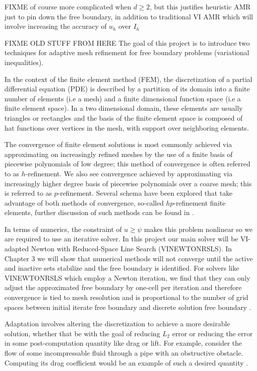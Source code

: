 \documentclass[]{interact}
\theoremstyle{plain}%
\theoremstyle{definition}
\theoremstyle{remark}
\begin{document}
FIXME of course more complicated when $d\ge 2$, but this justifies heuristic AMR just to pin down the free boundary, in addition to traditional VI AMR which will involve increasing the accuracy of $u_h$ over $I_h$

FIXME OLD STUFF FROM HERE The goal of this project is to introduce two techniques for adaptive mesh refinement for free boundary problems (variational inequalities).

In the context of the finite element method (FEM), the discretization of a partial differential equation (PDE) is described by a partition of its domain into a finite number of elements (i.e a mesh) and a finite dimensional function space (i.e a finite element space). In a two dimensional domain, these elements are usually triangles or rectangles and the basis of the finite element space is composed of hat functions over vertices in the mesh, with support over neighboring elements. 

The convergence of finite element solutions is most commonly achieved via approximating on increasingly refined meshes by the use of a finite basis of piecewise polynomials of low degree; this method of convergence is often referred to as $h$-refinement. We also see convergence achieved by approximating via increasingly higher degree basis of piecewise polynomials over a coarse mesh; this is referred to as $p$-refinement. Several schema have been explored that take advantage of both methods of convergence, so-called $hp$-refinement finite elements, further discussion of such methods can be found in \cite{Demkowicz2007}.

In terms of numerics, the constraint of $u \geq \psi$ makes this problem nonlinear so we are required to use an iterative solver. In this project our main solver will be VI-adapted Newton with Reduced-Space Line Search (VINEWTONRSLS). In Chapter 3 we will show that numerical methods will not converge until the active and inactive sets stabilize and the free boundary is identified. For solvers like VINEWTONRSLS which employ a Newton iteration, we find that they can only adjust the approximated free boundary by one-cell per iteration \citep{GraeserKornhuber2009} and therefore convergence is tied to mesh resolution and is proportional to the number of grid spaces between initial iterate free boundary and discrete solution free boundary \citep[page 324]{Bueler2021}. 

Adaptation involves altering the discretization to achieve a more desirable solution, whether that be with the goal of reducing $L_2$ error or reducing the error in some post-computation quantity like drag or lift. For example, consider the flow of some incompressable fluid through a pipe with an obstructive obstacle. Computing its drag coefficient would be an example of such a desired quantity \citep[Chapter 1.1]{BangerthRannacher2003}.
\end{document}
